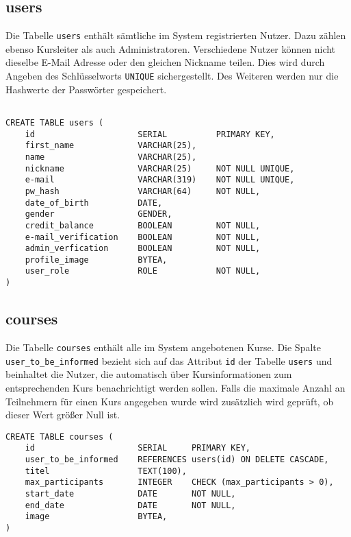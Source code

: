 \subsection{users}
Die Tabelle \texttt{users} enthält sämtliche im System registrierten Nutzer. Dazu zählen ebenso Kursleiter als auch Administratoren. Verschiedene Nutzer können nicht dieselbe E-Mail Adresse oder den gleichen Nickname teilen. Dies wird durch Angeben des Schlüsselworts \texttt{UNIQUE} sichergestellt. Des Weiteren werden nur die Hashwerte der Passwörter gespeichert.
	
\begin{verbatim}

CREATE TABLE users (
    id                     SERIAL          PRIMARY KEY,
    first_name             VARCHAR(25),
    name                   VARCHAR(25),
    nickname               VARCHAR(25)     NOT NULL UNIQUE,
    e-mail                 VARCHAR(319)    NOT NULL UNIQUE,
    pw_hash                VARCHAR(64)     NOT NULL,
    date_of_birth          DATE,
    gender                 GENDER,
    credit_balance         BOOLEAN         NOT NULL,
    e-mail_verification    BOOLEAN         NOT NULL,
    admin_verfication      BOOLEAN         NOT NULL,
    profile_image          BYTEA,
    user_role              ROLE            NOT NULL,
)
\end{verbatim}

\subsection{courses}
Die Tabelle \texttt{courses} enthält alle im System angebotenen Kurse. Die Spalte \texttt{user_to_be_informed} bezieht sich auf das Attribut \texttt{id} der Tabelle \texttt{users} und beinhaltet die Nutzer, die automatisch über Kursinformationen zum entsprechenden Kurs benachrichtigt werden sollen. Falls die maximale Anzahl an Teilnehmern für einen Kurs angegeben wurde wird zusätzlich wird geprüft, ob dieser Wert größer Null ist.

\begin{verbatim}
CREATE TABLE courses (
    id                     SERIAL     PRIMARY KEY,
    user_to_be_informed    REFERENCES users(id) ON DELETE CASCADE,
    titel                  TEXT(100),
    max_participants       INTEGER    CHECK (max_participants > 0),
    start_date             DATE       NOT NULL,
    end_date               DATE       NOT NULL,
    image                  BYTEA,
)
\end{verbatim}


